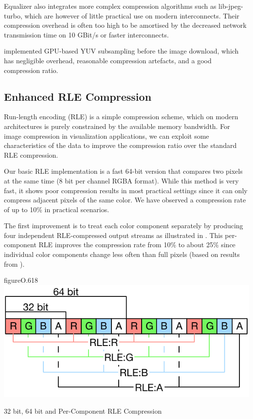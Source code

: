 Equalizer also integrates more complex compression algorithms such as
\textsf{lib-jpeg-turbo}, which are however of little practical use on modern
interconnects. Their compression overhead is often too high to be amortised by
the decreased network transmission time on 10 GBit/s or faster interconnects.

\cite{MEP:10} implemented GPU-based YUV subsampling before the image download,
which has negligible overhead, reasonable compression artefacts, and a good
compression ratio.

\subsection{Enhanced RLE Compression}

Run-length encoding (RLE) is a simple compression scheme, which on modern
architectures is purely constrained by the available memory bandwidth. For image
compression in visualization applications, we can exploit some characteristics
of the data to improve the compression ratio over the standard RLE compression.

Our basic RLE implementation is a fast 64-bit version that compares two pixels
at the same time (8 bit per channel RGBA format). While this method is very
fast, it shows poor compression results in most practical settings since it can
only compress adjacent pixels of the same color. We have observed a compression
rate of up to 10\% in practical scenarios.

The first improvement is to treat each color component separately by producing
four independent RLE-compressed output streams as illustrated in .
This per-component RLE improves the compression rate from 10\% to about 25\%
since individual color components change less often than full pixels (based on
results from \cite{MEP:10}).

\begin{wrapfloat}{figure}{O}{.618\textwidth}
  \includegraphics[width=.618\textwidth]{images/RLE}
  \caption{32 bit, 64 bit and Per-Component RLE Compression}
  \label{fRLE}
\end{wrapfloat}

